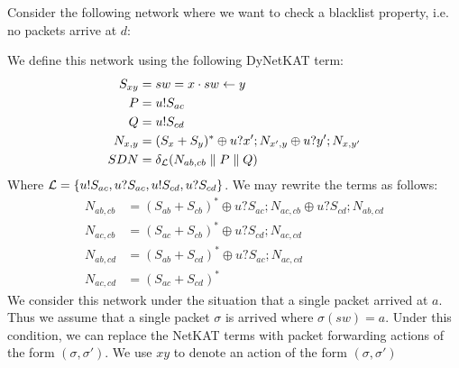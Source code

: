 \begin{example}
    Consider the following network where we want to check a blacklist
    property, i.e. no packets arrive at $d$:
    \begin{center}
    \end{center}
    We define this network using the following DyNetKAT term:
    \begin{align*}
        S_{xy}  & = sw = x \cdot sw \leftarrow y            \\
        P       & = u!S_{ac}                         \\
        Q       & = u!S_{cd}                         \\
        N_{x,y} & = (S_x+S_y)^* \oplus u?x';N_{x',y}
        \oplus u?y';N_{x,y'}                         \\
        SDN     & = \delta_{\mathcal{L}} (N_{ab,cb}
        \parallel P \parallel Q)
    \end{align*}
    Where $\mathcal{L} = \{u!S_{ac},u?S_{ac},u!S_{cd},u?S_{cd}\}$.
    We may rewrite the terms as follows:
    \begin{align*}
        N_{ab,cb} & = (S_{ab} + S_{cb})^* \oplus u?S_{ac};N_{ac,cb}
        \oplus u?S_{cd};N_{ab,cd}                                   \\
        N_{ac,cb} & = (S_{ac}+S_{cb})^* \oplus u?S_{cd};N_{ac,cd}   \\
        N_{ab,cd} & = (S_{ab}+S_{cd})^* \oplus u?S_{ac};N_{ac,cd}   \\
        N_{ac,cd} & = (S_{ac}+S_{cd})^*
    \end{align*}
    We consider this network under the situation that a single packet
    arrived at $a$.
    Thus we assume that a single packet $\sigma$ is arrived where
    $\sigma(sw) = a$.
    Under this condition, we can replace the NetKAT terms with
    packet forwarding actions of the form $(\sigma, \sigma')$.
    We use $xy$ to denote an action of the form $(\sigma,\sigma')$

\end{example}
